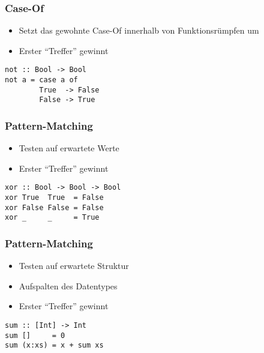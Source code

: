 \begin{frame}[fragile]
\frametitle{Case-Of}
\begin{block}{\vspace*{-3ex}}
\begin{itemize}
	\item Setzt das gewohnte Case-Of innerhalb von Funktionsrümpfen um
	\item Erster "`Treffer"' gewinnt
\end{itemize}
\end{block}
\pause
\begin{lstlisting}
not :: Bool -> Bool
not a = case a of 
        True  -> False
        False -> True 
\end{lstlisting}
\end{frame}

\begin{frame}[fragile]
\frametitle{Pattern-Matching}
\begin{block}{\vspace*{-3ex}}
\begin{itemize}
  \item Testen auf erwartete Werte
  \item Erster "`Treffer"' gewinnt
\end{itemize}
\end{block}
\pause
\begin{lstlisting}
xor :: Bool -> Bool -> Bool
xor True  True  = False
xor False False = False
xor _     _     = True
\end{lstlisting}
\end{frame}

\begin{frame}[fragile]
\frametitle{Pattern-Matching}
\begin{block}{\vspace*{-3ex}}
\begin{itemize}
  \item Testen auf erwartete Struktur
  \item Aufspalten des Datentypes
  \item Erster "`Treffer"' gewinnt
\end{itemize}
\end{block}
\pause
\begin{lstlisting}
sum :: [Int] -> Int
sum []     = 0
sum (x:xs) = x + sum xs
\end{lstlisting}
\end{frame}

